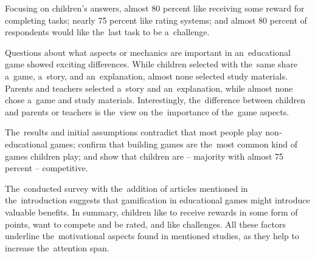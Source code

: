 Focusing on children's answers, almost 80 percent like receiving some reward for completing tasks; nearly 75 percent like rating systems; and almost 80 percent of respondents would like the~last task to be a~challenge.

Questions about what aspects or mechanics are important in an~educational game showed exciting differences.
While children selected with the~same share a~game, a~story, and an~explanation, almost none selected study materials.
Parents and teachers selected a~story and an~explanation, while almost none chose a~game and study materials.
Interestingly, the~difference between children and parents or teachers is the~view on the~importance of the~game aspects.

The~results and initial assumptions contradict that most people play non-educational games; confirm that building games are the~most common kind of games children play; and show that children are -- majority with almost 75 percent -- competitive. 

The~conducted survey with the~addition of articles mentioned in the~introduction suggests that gamification in educational games might introduce valuable benefits.
In summary, children like to receive rewards in some form of points, want to compete and be rated, and like challenges.
All these factors underline the~motivational aspects found in mentioned studies,
as they help to increase the~attention span.
